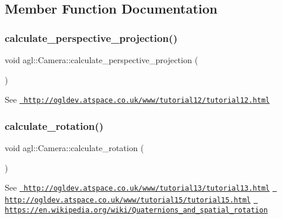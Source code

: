 \subsection{Member Function Documentation}
\mbox{\label{classagl_1_1Camera_a75ae39c49e4ccc6c850eb32a9bb70e93}} 
\subsubsection{\texorpdfstring{calculate\_perspective\_projection()}{calculate\_perspective\_projection()}}
{\footnotesize\ttfamily void agl\+::\+Camera\+::calculate\+\_\+perspective\+\_\+projection (\begin{DoxyParamCaption}{ }\end{DoxyParamCaption})\hspace{0.3cm}{\ttfamily [private]}}

See \href{http://ogldev.atspace.co.uk/www/tutorial12/tutorial12.html}{\texttt{ http\+://ogldev.\+atspace.\+co.\+uk/www/tutorial12/tutorial12.\+html}} \mbox{\label{classagl_1_1Camera_a88af7620d31f286d147b0b4df84d5077}} 
\subsubsection{\texorpdfstring{calculate\_rotation()}{calculate\_rotation()}}
{\footnotesize\ttfamily void agl\+::\+Camera\+::calculate\+\_\+rotation (\begin{DoxyParamCaption}{ }\end{DoxyParamCaption})\hspace{0.3cm}{\ttfamily [private]}}

See \href{http://ogldev.atspace.co.uk/www/tutorial13/tutorial13.html}{\texttt{ http\+://ogldev.\+atspace.\+co.\+uk/www/tutorial13/tutorial13.\+html}} \href{http://ogldev.atspace.co.uk/www/tutorial15/tutorial15.html}{\texttt{ http\+://ogldev.\+atspace.\+co.\+uk/www/tutorial15/tutorial15.\+html}} \href{https://en.wikipedia.org/wiki/Quaternions_and_spatial_rotation}{\texttt{ https\+://en.\+wikipedia.\+org/wiki/\+Quaternions\+\_\+and\+\_\+spatial\+\_\+rotation}} \mbox{\label{classagl_1_1Camera_a03a502bcfaa24c6469f3357e1df43118}} 
